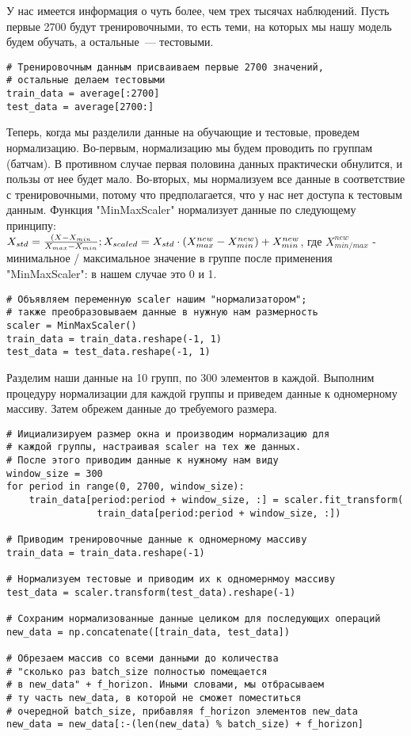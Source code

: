 \documentclass[12pt, a4paper]{article}
\begin{document}
У нас имеется информация о чуть более, чем трех тысячах наблюдений. Пусть первые 2700 будут тренировочными, то есть теми, на которых мы нашу модель будем обучать, а остальные~--- тестовыми.

\begin{verbatim}
# Тренировочным данным присваиваем первые 2700 значений,
# остальные делаем тестовыми
train_data = average[:2700]
test_data = average[2700:]
\end{verbatim}

Теперь, когда мы разделили данные на обучающие и тестовые, проведем нормализацию. Во-первым, нормализацию мы будем проводить по группам (батчам). В противном случае первая половина данных практически обнулится, и пользы от нее будет мало. Во-вторых, мы нормализуем все данные в соответствие с тренировочными, потому что предполагается, что у нас нет доступа к тестовым данным. Функция "MinMaxScaler" нормализует данные по следующему принципу: \\
$X_{std} = \frac{(X - X_{min}}{X_{max} - X_{min}}; \\
X_{scaled} = X_{std} \cdot (X_{max}^{new} - X_{min}^{new}) + X_{min}^{new}$, где $X_{min/max}^{new}$ - минимальное / максимальное значение в группе после применения "MinMaxScaler": в нашем случае это 0 и 1.

\begin{verbatim}
# Объявляем переменную scaler нашим "нормализатором";
# также преобразовываем данные в нужную нам размерность
scaler = MinMaxScaler()
train_data = train_data.reshape(-1, 1)
test_data = test_data.reshape(-1, 1)
\end{verbatim}

Разделим наши данные на 10 групп, по 300 элементов в каждой. Выполним процедуру нормализации для каждой группы и приведем данные к одномерному массиву. Затем обрежем данные до требуемого размера.

\begin{verbatim}
# Иициализируем размер окна и производим нормализацию для
# каждой группы, настраивая scaler на тех же данных.
# После этого приводим данные к нужному нам виду
window_size = 300
for period in range(0, 2700, window_size):
	train_data[period:period + window_size, :] = scaler.fit_transform(
				train_data[period:period + window_size, :])

# Приводим тренировочные данные к одномерному массиву
train_data = train_data.reshape(-1)

# Нормализуем тестовые и приводим их к одномернмоу массиву
test_data = scaler.transform(test_data).reshape(-1)

# Сохраним нормализованные данные целиком для последующих операций
new_data = np.concatenate([train_data, test_data])

# Обрезаем массив со всеми данными до количества
# "сколько раз batch_size полностью помещается
# в new_data" + f_horizon. Иными словами, мы отбрасываем
# ту часть new_data, в которой не сможет поместиться
# очередной batch_size, прибавляя f_horizon элементов new_data
new_data = new_data[:-(len(new_data) % batch_size) + f_horizon]
\end{verbatim}
\end{document}
